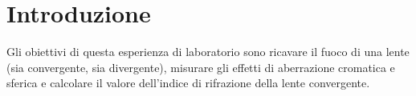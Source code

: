 \section{Introduzione}

Gli obiettivi di questa esperienza di laboratorio sono ricavare il fuoco di una lente (sia convergente, sia divergente),
misurare gli effetti di aberrazione cromatica e sferica e calcolare il valore dell'indice di rifrazione della lente convergente. 

